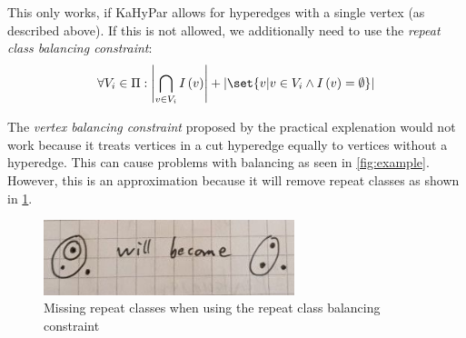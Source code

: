 \documentclass{article}
\DeclarePairedDelimiter\set\{\}
\begin{document}
	This only works, if KaHyPar allows for hyperedges with a single vertex (as described above). If this is not allowed, we additionally need to use the \textit{repeat class balancing constraint}: \[ \forall V_i \in \Pi: \left|\bigcap_{v \in V_i}I\left(v\right)\right| + \left|\set{v | v \in V_i \land I\left(v\right)=\emptyset}\right| \]
	
	The \textit{vertex balancing constraint} proposed by the practical explenation would not work because it treats vertices in a cut hyperedge equally to vertices without a hyperedge. This can cause problems with balancing as seen in \cref{fig:example}. However, this is an approximation because it will remove repeat classes as shown in \cref{fig:missingrc}.
	
	\begin{figure}[ht]
		\centering
		\includegraphics[width=0.65\textwidth]{missingrc.png}
		\caption{Missing repeat classes when using the repeat class balancing constraint}
		\label{fig:missingrc}
	\end{figure}
\end{document}
